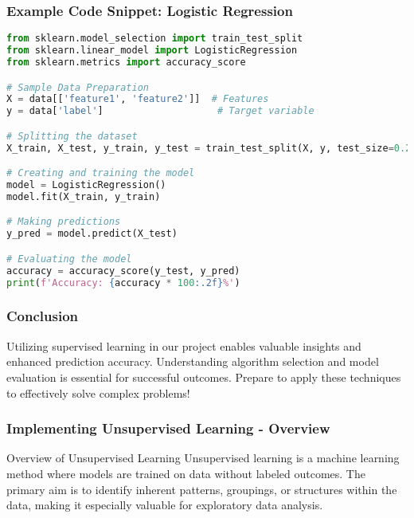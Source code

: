 \documentclass[aspectratio=169]{beamer}
\begin{document}
\begin{frame}[fragile]
  \frametitle{Example Code Snippet: Logistic Regression}
  \begin{lstlisting}[language=Python]
from sklearn.model_selection import train_test_split
from sklearn.linear_model import LogisticRegression
from sklearn.metrics import accuracy_score

# Sample Data Preparation
X = data[['feature1', 'feature2']]  # Features
y = data['label']                    # Target variable

# Splitting the dataset
X_train, X_test, y_train, y_test = train_test_split(X, y, test_size=0.2, random_state=42)

# Creating and training the model
model = LogisticRegression()
model.fit(X_train, y_train)

# Making predictions
y_pred = model.predict(X_test)

# Evaluating the model
accuracy = accuracy_score(y_test, y_pred)
print(f'Accuracy: {accuracy * 100:.2f}%')
  \end{lstlisting}
\end{frame}

\begin{frame}[fragile]
  \frametitle{Conclusion}
  Utilizing supervised learning in our project enables valuable insights and enhanced prediction accuracy. Understanding algorithm selection and model evaluation is essential for successful outcomes. Prepare to apply these techniques to effectively solve complex problems!
\end{frame}

\begin{frame}[fragile]
    \frametitle{Implementing Unsupervised Learning - Overview}
    \begin{block}{Overview of Unsupervised Learning}
        Unsupervised learning is a machine learning method where models are trained on data without labeled outcomes. The primary aim is to identify inherent patterns, groupings, or structures within the data, making it especially valuable for exploratory data analysis.
    \end{block}
\end{frame}
\end{document}
